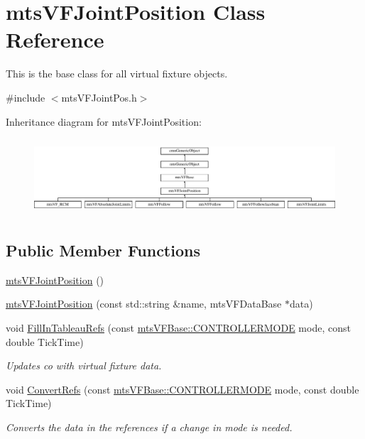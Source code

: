 \hypertarget{classmts_v_f_joint_position}{\section{mts\-V\-F\-Joint\-Position Class Reference}
\label{classmts_v_f_joint_position}
}


This is the base class for all virtual fixture objects.  




{\ttfamily \#include $<$mts\-V\-F\-Joint\-Pos.\-h$>$}

Inheritance diagram for mts\-V\-F\-Joint\-Position\-:\begin{figure}[H]
\begin{center}
\leavevmode
\includegraphics[height=2.880659cm]{df/d5f/classmts_v_f_joint_position}
\end{center}
\end{figure}
\subsection*{Public Member Functions}
\begin{DoxyCompactItemize}
\item 
\hyperlink{classmts_v_f_joint_position_ad91639a817a92283cd54e06e2f560d6e}{mts\-V\-F\-Joint\-Position} ()
\item 
\hyperlink{classmts_v_f_joint_position_a0462780e99a95c87a1cf3d2a1046d5a3}{mts\-V\-F\-Joint\-Position} (const std\-::string \&name, mts\-V\-F\-Data\-Base $\ast$data)
\item 
void \hyperlink{classmts_v_f_joint_position_ac7b7a944fb075d0775cb32424f02916f}{Fill\-In\-Tableau\-Refs} (const \hyperlink{classmts_v_f_base_a742dd08f8b70bafeb746cec14d9ee974}{mts\-V\-F\-Base\-::\-C\-O\-N\-T\-R\-O\-L\-L\-E\-R\-M\-O\-D\-E} mode, const double Tick\-Time)
\begin{DoxyCompactList}\small\item\em Updates co with virtual fixture data. \end{DoxyCompactList}\item 
void \hyperlink{classmts_v_f_joint_position_ab2836af74d11806d248b146a41a448d0}{Convert\-Refs} (const \hyperlink{classmts_v_f_base_a742dd08f8b70bafeb746cec14d9ee974}{mts\-V\-F\-Base\-::\-C\-O\-N\-T\-R\-O\-L\-L\-E\-R\-M\-O\-D\-E} mode, const double Tick\-Time)
\begin{DoxyCompactList}\small\item\em Converts the data in the references if a change in mode is needed. \end{DoxyCompactList}\end{DoxyCompactItemize}
